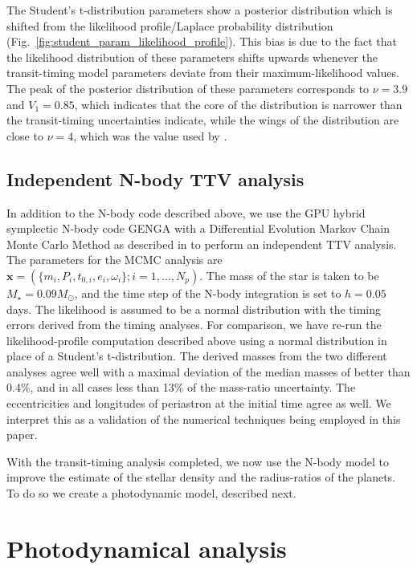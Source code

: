 \documentclass[twocolumn]{aastex63}
\begin{document}
The Student's t-distribution parameters show a posterior distribution which is shifted from the likelihood profile/Laplace probability distribution (Fig.\ \ref{fig:student_param_likelihood_profile}).  This bias is due to the fact that the likelihood distribution of these parameters shifts upwards whenever the transit-timing model parameters deviate from their maximum-likelihood values.  The peak of  the  posterior distribution of these parameters corresponds to
$\nu = 3.9$ and $V_1 = 0.85$, which indicates that the core of the distribution is narrower than the transit-timing uncertainties indicate, while the wings of the distribution are close to $\nu = 4$, which was the value used by
\citet{JontofHutter2016}.



\subsection{Independent N-body TTV analysis}

In addition to the N-body code described above, we use the GPU hybrid symplectic N-body code GENGA \citep{Grimm2014} with a Differential Evolution Markov Chain Monte Carlo Method  \citep[DEMCMC;][]{terBraak2006} as described in \citet{Grimm2018} to perform an independent TTV analysis. The parameters for the MCMC analysis are $\mathbf{x} = (\{m_i, P_i,t_{0,i},e_i,\omega_i\};i=1,...,N_p)$. The mass of the star is taken to be $M_{\star} = 0.09 M_{\odot}$, and the time step of the N-body integration is set to $h=0.05$ days.  The
likelihood is assumed to be a normal distribution with the timing errors derived from
the timing analyses.  For comparison, we have re-run the likelihood-profile
computation described above using a normal distribution in place of a Student's t-distribution.
The derived masses from the two different analyses agree well with a maximal deviation of the median masses of better than 0.4\%, and in all cases less than 13\% of the mass-ratio uncertainty.  The eccentricities and longitudes of periastron at the initial time agree as well.  We interpret this as a validation of the numerical techniques being employed in this paper.

With the transit-timing analysis completed, we now use the N-body model to improve the estimate of the stellar density and the radius-ratios of the planets.  To do so we create a photodynamic model, described next.

\section{Photodynamical analysis}\label{sec:photodynamics}
\end{document}
